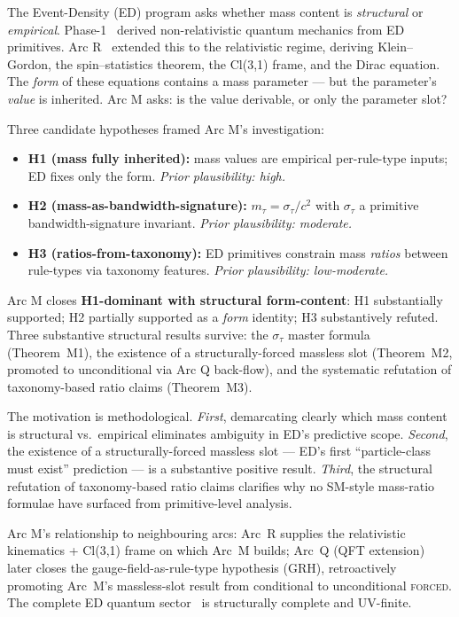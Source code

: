 \documentclass[11pt,a4paper]{article}
\begin{document}
The Event-Density (ED) program asks whether mass content is \emph{structural} or \emph{empirical}. Phase-1~\cite{phase1} derived non-relativistic quantum mechanics from ED primitives. Arc R~\cite{arcr} extended this to the relativistic regime, deriving Klein--Gordon, the spin--statistics theorem, the Cl(3,1) frame, and the Dirac equation. The \emph{form} of these equations contains a mass parameter --- but the parameter's \emph{value} is inherited. Arc M asks: is the value derivable, or only the parameter slot?

Three candidate hypotheses framed Arc M's investigation:
\begin{itemize}
  \item \textbf{H1 (mass fully inherited):} mass values are empirical per-rule-type inputs; ED fixes only the form. \emph{Prior plausibility: high.}
  \item \textbf{H2 (mass-as-bandwidth-signature):} $m_\tau = \sigma_\tau/c^2$ with $\sigma_\tau$ a primitive bandwidth-signature invariant. \emph{Prior plausibility: moderate.}
  \item \textbf{H3 (ratios-from-taxonomy):} ED primitives constrain mass \emph{ratios} between rule-types via taxonomy features. \emph{Prior plausibility: low-moderate.}
\end{itemize}

Arc M closes \textbf{H1-dominant with structural form-content}: H1 substantially supported; H2 partially supported as a \emph{form} identity; H3 substantively refuted. Three substantive structural results survive: the $\sigma_\tau$ master formula (Theorem~M1), the existence of a structurally-forced massless slot (Theorem~M2, promoted to unconditional via Arc Q back-flow), and the systematic refutation of taxonomy-based ratio claims (Theorem~M3).

The motivation is methodological. \emph{First}, demarcating clearly which mass content is structural vs.\ empirical eliminates ambiguity in ED's predictive scope. \emph{Second}, the existence of a structurally-forced massless slot --- ED's first ``particle-class must exist'' prediction --- is a substantive positive result. \emph{Third}, the structural refutation of taxonomy-based ratio claims clarifies why no SM-style mass-ratio formulae have surfaced from primitive-level analysis.

Arc M's relationship to neighbouring arcs: Arc~R supplies the relativistic kinematics + Cl(3,1) frame on which Arc~M builds; Arc~Q (QFT extension)~\cite{arcq} later closes the gauge-field-as-rule-type hypothesis (GRH), retroactively promoting Arc~M's massless-slot result from conditional to unconditional \textsc{forced}. The complete ED quantum sector~\cite{phase2syn} is structurally complete and UV-finite.
\end{document}
